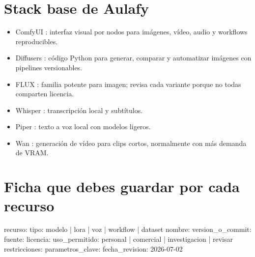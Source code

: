 \documentclass[11pt,a4paper]{book}
\begin{document}
\section{Stack base de Aulafy}
\begin{itemize}\item ComfyUI : interfaz visual por nodos para imágenes, vídeo, audio y workflows reproducibles.\end{itemize}
\begin{itemize}\item Diffusers : código Python para generar, comparar y automatizar imágenes con pipelines versionables.\end{itemize}
\begin{itemize}\item FLUX : familia potente para imagen; revisa cada variante porque no todas comparten licencia.\end{itemize}
\begin{itemize}\item Whisper : transcripción local y subtítulos.\end{itemize}
\begin{itemize}\item Piper : texto a voz local con modelos ligeros.\end{itemize}
\begin{itemize}\item Wan : generación de vídeo para clips cortos, normalmente con más demanda de VRAM.\end{itemize}
\section{Ficha que debes guardar por cada recurso}
\begin{codebox}
recurso:
  tipo: modelo | lora | voz | workflow | dataset
  nombre:
  version_o_commit:
  fuente:
  licencia:
  uso_permitido: personal | comercial | investigacion | revisar
  restricciones:
  parametros_clave:
  fecha_revision: 2026-07-02
\end{codebox}
\end{document}
